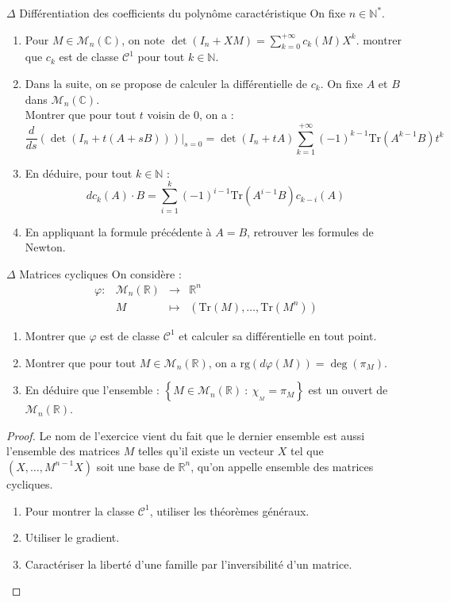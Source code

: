 \documentclass[french,a4paper]{article}
\newcommand{\N}{\mathbb{N}}
\newcommand{\R}{\mathbb{R}}
\newcommand{\C}{\mathbb{C}}
\newcommand{\st}{^*}
\newcommand{\Tr}{\text{Tr}}
\theoremstyle{plain}
\theoremstyle{definition}
\theoremstyle{remark}
\begin{document}
\begin{ex}[Moulin.10]{$\Delta$ Différentiation des coefficients du polynôme caractéristique}
	On fixe $n\in\N\st$.
	\begin{enumerate}
		\item Pour $M\in\mathcal{M}_n(\C)$, on note $\det(I_n+XM)=\displaystyle\sum_{k=0}^{+\infty}c_k(M)X^k$. montrer que $c_k$ est de classe $\mathcal{C}^1$ pour tout $k\in\N$.
		\item Dans la suite, on se propose de calculer la différentielle de $c_k$. On fixe $A$ et $B$ dans $\mathcal{M}_n(\C)$. \\
		Montrer que pour tout $t$ voisin de $0$, on a : $$\frac{d}{ds}\left(\det(I_n+t(A+sB))\right)\bigg|_{s=0}=\det(I_n+tA)\sum_{k=1}^{+\infty}(-1)^{k-1}\Tr(A^{k-1}B)t^k$$
		\item En déduire, pour tout $k\in\N$ : $$dc_k(A)\cdot B=\sum_{i=1}^{k}(-1)^{i-1}\Tr(A^{i-1}B)c_{k-i}(A)$$
		\item En appliquant la formule précédente à $A=B$, retrouver les formules de Newton.
	\end{enumerate}
\end{ex}

\begin{ex}[Moulin.11 / X]{$\Delta$ Matrices cycliques}
	On considère : $$\begin{array}{lrcl}
		\varphi:&\mathcal{M}_n(\R)&\longrightarrow&\R^n \\
		&M&\longmapsto&(\Tr(M),\ldots,\Tr(M^n))
	\end{array}$$
	\begin{enumerate}
		\item Montrer que $\varphi$ est de classe $\mathcal{C}^1$ et calculer sa différentielle en tout point.
		\item Montrer que pour tout $M\in\mathcal{M}_n(\R)$, on a $\text{rg}(d\varphi(M))=\deg(\pi_M)$.
		\item En déduire que l'ensemble : $\left\{M\in\mathcal{M}_n(\R)\ : \ \chi_{_M}=\pi_M\right\}$ est un ouvert de $\mathcal{M}_n(\R)$.
	\end{enumerate}
\end{ex}
\begin{proof}
	Le nom de l'exercice vient du fait que le dernier ensemble est aussi l'ensemble des matrices $M$ telles qu'il existe un vecteur $X$ tel que $(X,\ldots,M^{n-1}X)$ soit une base de $\R^n$, qu'on appelle ensemble des matrices cycliques.
	\begin{enumerate}
		\item Pour montrer la classe $\mathcal{C}^1$, utiliser les théorèmes généraux.
		\item Utiliser le gradient.
		\item Caractériser la liberté d'une famille par l'inversibilité d'un matrice.
	\end{enumerate}
\end{proof}
\end{document}
